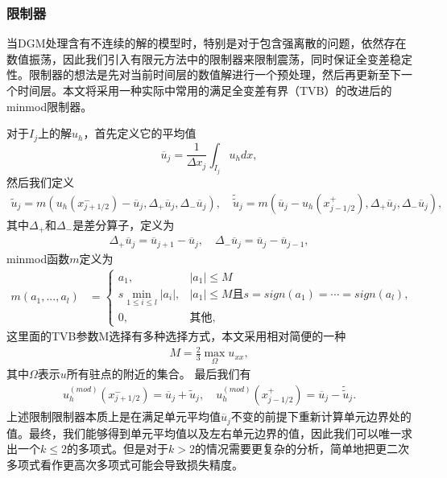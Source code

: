 \subsubsection{限制器}
当DGM处理含有不连续的解的模型时，特别是对于包含强离散的问题，依然存在数值振荡，因此我们引入有限元方法中的限制器来限制震荡，同时保证全变差稳定性。限制器的想法是先对当前时间层的数值解进行一个预处理，然后再更新至下一个时间层。本文将采用一种实际中常用的满足全变差有界（TVB）的改进后的minmod限制器\cite{cockburn1989tvb2}。

对于$I_j$上的解$u_h$，首先定义它的平均值
$$
    \overline{u}_j = \frac{1}{\Delta x_j}\int_{I_j}u_h dx,
$$
然后我们定义
\begin{align}
    \tilde{u}_j = m(u_h(x^-_{j+1/2})-\overline{u}_j, \Delta_+\overline{u}_j, \Delta_-\overline{u}_j), \quad \tilde{\tilde{u}}_j = m(\overline{u}_j-u_h(x^+_{j-1/2}), \Delta_+\overline{u}_j, \Delta_-\overline{u}_j),
\end{align}
其中$\Delta_+$和$\Delta_-$是差分算子，定义为
\begin{align}
    \Delta_+\overline{u}_j = \overline{u}_{j+1}-\overline{u}_{j}, \quad \Delta_-\overline{u}_j = \overline{u}_{j}-\overline{u}_{j-1},
\end{align}
minmod函数$m$定义为
\begin{align}
    m(a_1, ..., a_l) & =
    \begin{cases}
        a_1,                         & |a_1| \leq M                                              \\
        s \min_{1\leq i\leq l}|a_i|, & |a_1| \leq M \text{且}s = sign(a_1) = \cdots = sign(a_l), \\
        0 ,                          & \text{其他},
    \end{cases}
\end{align}
这里面的TVB参数M选择有多种选择方式，本文采用相对简便的一种\cite{cockburn1989tvb3}
\begin{align}
    M = \frac{2}{3}\max_{\Omega}u_{xx},
\end{align}
其中$\Omega$表示$u$所有驻点的附近的集合。
最后我们有
\begin{align}
    u^{(mod)}_h(x^-_{j+1/2}) = \overline{u}_j + \tilde{u}_j, \quad u^{(mod)}_h(x^+_{j-1/2}) = \overline{u}_j - \tilde{\tilde{u}}_j.
\end{align}
上述限制限制器本质上是在满足单元平均值$\overline{u}_j$不变的前提下重新计算单元边界处的值。最终，我们能够得到单元平均值以及左右单元边界的值，因此我们可以唯一求出一个$k\leq 2$的多项式。但是对于$k> 2$的情况需要更复杂的分析，简单地把更二次多项式看作更高次多项式可能会导致损失精度。

